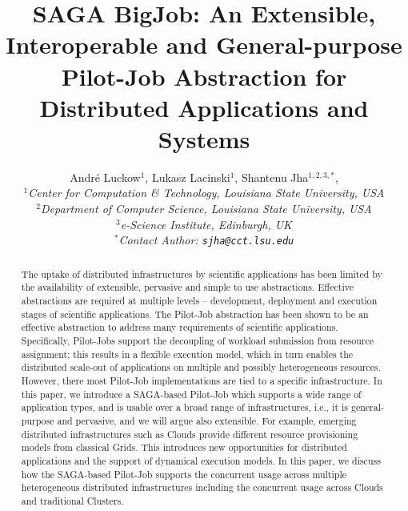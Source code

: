 \documentclass[conference,final]{IEEEtran}
\title{SAGA BigJob: An Extensible, Interoperable and General-purpose
  Pilot-Job Abstraction for Distributed Applications and Systems}
\author{
Andr\'e Luckow$^{1}$, Lukasz Lacinski$^{1}$,   Shantenu Jha$^{1,2,3,*}$,\\
  \small{\emph{$^{1}$Center for Computation \& Technology, Louisiana State University, USA}}\\
  \small{\emph{$^{2}$Department of Computer Science, Louisiana State University, USA}}\\
  \small{\emph{$^{3}$e-Science Institute, Edinburgh, UK}}\\
  \small{\emph{$^{*}$Contact Author: \texttt{sjha@cct.lsu.edu}}}\\
}
\newcommand{\up}{\vspace*{-1em}}
\newcommand{\alnote}[1]{ {\textcolor{blue} { ***AL: #1 }}}
\newcommand{\jhanote}[1]{ {\textcolor{red} { ***SJ: #1 }}}
\newcommand{\alnote}[1]{}
\newcommand{\jhanote}[1]{}
\begin{document}
 

\maketitle    


\begin{abstract}
  The uptake of distributed infrastructures by scientific applications
  has been limited by the availability of extensible, pervasive and
  simple to use abstractions. Effective abstractions are required at
  multiple levels -- development, deployment and execution stages of
  scientific applications. The Pilot-Job abstraction has been shown to
  be an effective abstraction to address many requirements of
  scientific applications.  Specifically, Pilot-Jobs support the
  decoupling of workload submission from resource assignment; this
  results in a flexible execution model, which in turn enables the
  distributed scale-out of applications on multiple and possibly
  heterogeneous resources.  However, there most Pilot-Job
  implementations are tied to a specific infrastructure.  In this
  paper, we introduce a SAGA-based Pilot-Job which supports a wide
  range of application types, and is usable over a broad range of
  infrastructures, i.e., it is general-purpose and pervasive, and we
  will argue also extensible. For example, emerging distributed
  infrastructures such as Clouds provide different resource
  provisioning models from classical Grids. This introduces new
  opportunities for distributed applications and the support of
  dynamical execution models. In this paper, we discuss how the
  SAGA-based Pilot-Job %
  supports the concurrent usage across multiple heterogeneous
  distributed infrastructures including the concurrent usage across
  Clouds and traditional Clusters.  %
\end{abstract}



\end{document}

